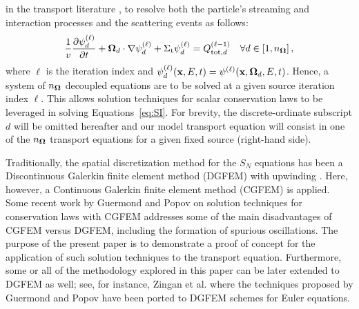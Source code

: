 in the transport literature \cite{glasstone,lewis,duderstadt}, to resolve
both the particle's streaming and interaction processes and the scattering events as follows:
\begin{equation} \label{eq:SI}
  \frac{1}{v}\frac{\partial \psi_d^{(\ell)}}{\partial t}
    + \mathbf{\Omega}_{d}\cdot\nabla\psi_d^{(\ell)}
    + \Sigma_\textup{t}\psi_d^{(\ell)} = Q_{\textup{tot},d}^{(\ell-1)} \quad \forall d \in [1,n_{\mathbf{\Omega}}]\,, 
\end{equation}
where $\ell$ is the iteration index and $\psi_d^{(\ell)}(\mathbf{x},E,t) = \psi^{(\ell)}(\mathbf{x},\mathbf{\Omega}_d,E,t)$.
Hence, a system of $n_{\mathbf{\Omega}}$ decoupled equations are to be solved
at a given source iteration index $\ell$. This allows solution techniques for scalar conservation
laws to be leveraged in solving Equations~\eqref{eq:SI}. For brevity, the discrete-ordinate subscript $d$
will be omitted hereafter and our model transport equation will consist in one of the $n_{\mathbf{\Omega}}$ transport
equations for a given fixed source (right-hand side).

Traditionally, the spatial discretization method for the $S_N$
equations has been a Discontinuous Galerkin finite element method (DGFEM) with upwinding
\cite{Lesaint1974,Reed_Hill_1973}. Here, however,
a Continuous Galerkin finite element method (CGFEM) is applied.
Some recent work by Guermond and Popov \cite{guermond_ev} on
solution techniques for conservation laws with CGFEM addresses some
of the main disadvantages of CGFEM versus DGFEM, including the formation
of spurious oscillations. The purpose of the present paper is to demonstrate a proof of concept
for the application of such solution techniques to the transport equation.
Furthermore, some or all of the methodology explored in this paper can be
later extended to DGFEM as well; see, for instance, Zingan et al. \cite{zingan_2013}
where the techniques proposed by Guermond and Popov \cite{guermond_ev} have been ported to DGFEM schemes for Euler equations.

